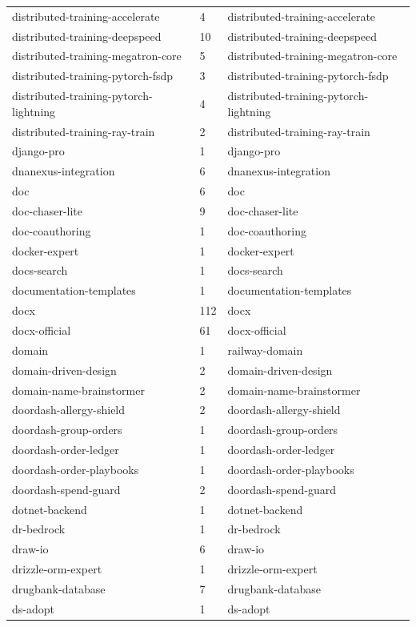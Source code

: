 \begin{longtable}{@{}lll@{}}
distributed-training-accelerate & 4 & distributed-training-accelerate\\
distributed-training-deepspeed & 10 & distributed-training-deepspeed\\
distributed-training-megatron-core & 5 & distributed-training-megatron-core\\
distributed-training-pytorch-fsdp & 3 & distributed-training-pytorch-fsdp\\
distributed-training-pytorch-lightning & 4 & distributed-training-pytorch-lightning\\
distributed-training-ray-train & 2 & distributed-training-ray-train\\
django-pro & 1 & django-pro\\
dnanexus-integration & 6 & dnanexus-integration\\
doc & 6 & doc\\
doc-chaser-lite & 9 & doc-chaser-lite\\
doc-coauthoring & 1 & doc-coauthoring\\
docker-expert & 1 & docker-expert\\
docs-search & 1 & docs-search\\
documentation-templates & 1 & documentation-templates\\
docx & 112 & docx\\
docx-official & 61 & docx-official\\
domain & 1 & railway-domain\\
domain-driven-design & 2 & domain-driven-design\\
domain-name-brainstormer & 2 & domain-name-brainstormer\\
doordash-allergy-shield & 2 & doordash-allergy-shield\\
doordash-group-orders & 1 & doordash-group-orders\\
doordash-order-ledger & 1 & doordash-order-ledger\\
doordash-order-playbooks & 1 & doordash-order-playbooks\\
doordash-spend-guard & 2 & doordash-spend-guard\\
dotnet-backend & 1 & dotnet-backend\\
dr-bedrock & 1 & dr-bedrock\\
draw-io & 6 & draw-io\\
drizzle-orm-expert & 1 & drizzle-orm-expert\\
drugbank-database & 7 & drugbank-database\\
ds-adopt & 1 & ds-adopt\\

\end{longtable}
